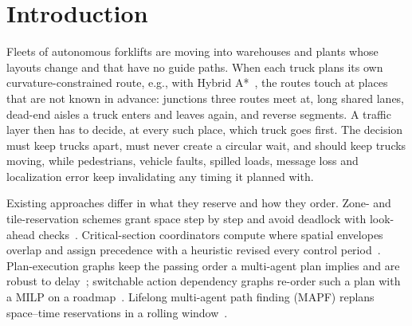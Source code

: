 \documentclass[conference]{IEEEtran}
\begin{document}
\section{Introduction}

Fleets of autonomous forklifts are moving into warehouses and plants whose
layouts change and that have no guide paths. When each truck plans its own
curvature-constrained route, e.g., with Hybrid A*~\cite{dolgov2010}, the routes
touch at places that are not known in advance: junctions three routes meet at,
long shared lanes, dead-end aisles a truck enters and leaves again, and reverse
segments. A traffic layer then has to decide, at every such place, which truck
goes first. The decision must keep trucks apart, must never create a circular
wait, and should keep trucks moving, while pedestrians, vehicle faults,
spilled loads, message loss and localization error keep invalidating any
timing it planned with.

Existing approaches differ in what they reserve and how they order.
Zone- and tile-reservation schemes grant space step by step and avoid deadlock
with look-ahead checks~\cite{fransen2022,pratissoli2024,verma2024}.
Critical-section coordinators compute where spatial envelopes overlap and
assign precedence with a heuristic revised every control
period~\cite{pecora2018,mannucci2019,mannucci2021}. Plan-execution graphs keep
the passing order a multi-agent plan implies and are robust to
delay~\cite{honig2016,honig2019,cap2016}; switchable action dependency graphs
re-order such a plan with a MILP on a roadmap~\cite{berndt2024}. Lifelong
multi-agent path finding (MAPF) replans space--time reservations in a rolling
window~\cite{li2021rhcr,varambally2022,bonetti2024}.
\end{document}
